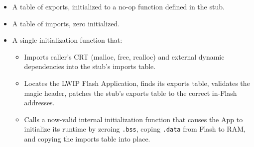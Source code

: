 \documentclass[titlepage]{report}
\begin{document}
		\begin{itemize}
			\item A table of exports, initialized to a no-op function defined in the stub.
			\item A table of imports, zero initialized.
			\item A single initialization function that:
			\begin{itemize}
				\item Imports caller's CRT (malloc, free, realloc) and external dynamic dependencies into the stub's imports table.
				\item Locates the LWIP Flash Application, finds its exports table, validates the magic header, patches the stub's exports table to the correct in-Flash addresses.
				\item Calls a now-valid internal initialization function that causes the App to initialize its runtime by zeroing \texttt{.bss}, coping \texttt{.data} from Flash to RAM, and copying the imports table into place.
			\end{itemize}
			\end{itemize}
\end{document}
